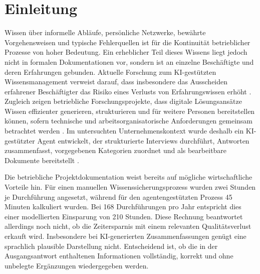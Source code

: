 \documentclass[
  10pt,
  ngerman,
  a4paper,
  toc=graduated,
  numbers=noenddot,
  headings=standardclasses,
  nonumberlist
]{scrartcl}
\begin{document}

\newpage
\cleardoublepage{}
{}
\listoftables

\newpage
{}
\renewcommand{\thepage}{\arabic{page}}
\setcounter{table}{0}

\section{Einleitung}
\label{sec:einleitung}

Wissen über informelle Abläufe, persönliche Netzwerke, bewährte Vorgehensweisen und typische Fehlerquellen ist für die Kontinuität betrieblicher Prozesse von hoher Bedeutung. Ein erheblicher Teil dieses Wissens liegt jedoch nicht in formalen Dokumentationen vor, sondern ist an einzelne Beschäftigte und deren Erfahrungen gebunden. Aktuelle Forschung zum KI-gestützten Wissensmanagement verweist darauf, dass insbesondere das Ausscheiden erfahrener Beschäftigter das Risiko eines Verlusts von Erfahrungswissen erhöht \cite[S.~1--7]{nicole_ottersbock_wissensmanagement_2026}. Zugleich zeigen betriebliche Forschungsprojekte, dass digitale Lösungsansätze Wissen effizienter generieren, strukturieren und für weitere Personen bereitstellen können, sofern technische und arbeitsorganisatorische Anforderungen gemeinsam betrachtet werden \cite[S.~429--432]{schweiger_serwiss_2023}. Im untersuchten Unternehmenskontext wurde deshalb ein KI-gestützter Agent entwickelt, der strukturierte Interviews durchführt, Antworten zusammenfasst, vorgegebenen Kategorien zuordnet und als bearbeitbare Dokumente bereitstellt \cite{sommer2026projekt}.

Die betriebliche Projektdokumentation weist bereits auf mögliche wirtschaftliche Vorteile hin. Für einen manuellen Wissenssicherungsprozess wurden zwei Stunden je Durchführung angesetzt, während für den agentengestützten Prozess 45 Minuten kalkuliert wurden. Bei 168 Durchführungen pro Jahr entspricht dies einer modellierten Einsparung von 210 Stunden. Diese Rechnung beantwortet allerdings noch nicht, ob die Zeitersparnis mit einem relevanten Qualitätsverlust erkauft wird. Insbesondere bei KI-generierten Zusammenfassungen genügt eine sprachlich plausible Darstellung nicht. Entscheidend ist, ob die in der Ausgangsantwort enthaltenen Informationen vollständig, korrekt und ohne unbelegte Ergänzungen wiedergegeben werden.
\end{document}
